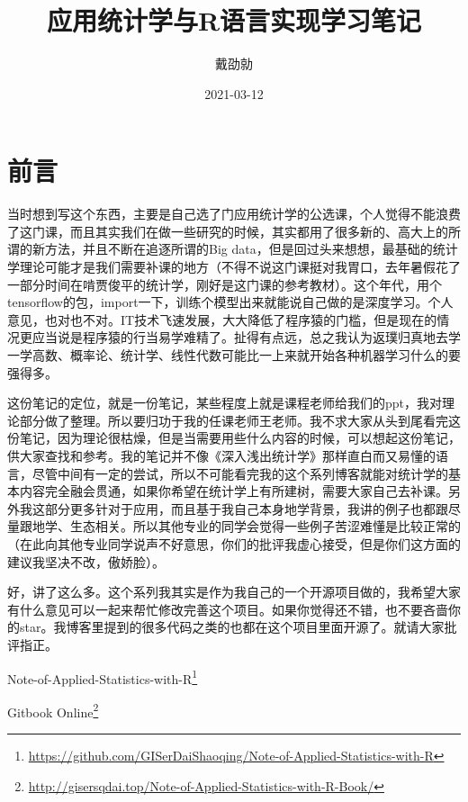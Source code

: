 \documentclass[]{ctexbook}
\title{应用统计学与R语言实现学习笔记}
\author{戴劭勍}
\date{2021-03-12}
\renewcommand{\href}[2]{#2\footnote{\url{#1}}}
\begin{document}
\maketitle


\thispagestyle{empty}



\setlength{\abovedisplayskip}{-5pt}
\setlength{\abovedisplayshortskip}{-5pt}

{
\setcounter{tocdepth}{2}
\tableofcontents
}
\hypertarget{ux524dux8a00}{%
\chapter*{前言}\label{ux524dux8a00}}


当时想到写这个东西，主要是自己选了门应用统计学的公选课，个人觉得不能浪费了这门课，而且其实我们在做一些研究的时候，其实都用了很多新的、高大上的所谓的新方法，并且不断在追逐所谓的Big data，但是回过头来想想，最基础的统计学理论可能才是我们需要补课的地方（不得不说这门课挺对我胃口，去年暑假花了一部分时间在啃贾俊平的统计学，刚好是这门课的参考教材）。这个年代，用个tensorflow的包，import一下，训练个模型出来就能说自己做的是深度学习。个人意见，也对也不对。IT技术飞速发展，大大降低了程序猿的门槛，但是现在的情况更应当说是程序猿的行当易学难精了。扯得有点远，总之我认为返璞归真地去学一学高数、概率论、统计学、线性代数可能比一上来就开始各种机器学习什么的要强得多。

这份笔记的定位，就是一份笔记，某些程度上就是课程老师给我们的ppt，我对理论部分做了整理。所以要归功于我的任课老师王老师。我不求大家从头到尾看完这份笔记，因为理论很枯燥，但是当需要用些什么内容的时候，可以想起这份笔记，供大家查找和参考。我的笔记并不像《深入浅出统计学》那样直白而又易懂的语言，尽管中间有一定的尝试，所以不可能看完我的这个系列博客就能对统计学的基本内容完全融会贯通，如果你希望在统计学上有所建树，需要大家自己去补课。另外我这部分更多针对于应用，而且基于我自己本身地学背景，我讲的例子也都跟尽量跟地学、生态相关。所以其他专业的同学会觉得一些例子苦涩难懂是比较正常的（在此向其他专业同学说声不好意思，你们的批评我虚心接受，但是你们这方面的建议我坚决不改，傲娇脸）。

好，讲了这么多。这个系列我其实是作为我自己的一个开源项目做的，我希望大家有什么意见可以一起来帮忙修改完善这个项目。如果你觉得还不错，也不要吝啬你的star。我博客里提到的很多代码之类的也都在这个项目里面开源了。就请大家批评指正。

\href{https://github.com/GISerDaiShaoqing/Note-of-Applied-Statistics-with-R}{Note-of-Applied-Statistics-with-R}

\href{http://gisersqdai.top/Note-of-Applied-Statistics-with-R-Book/}{Gitbook Online}
\end{document}
